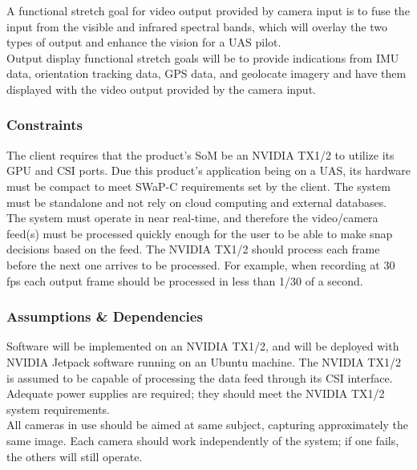 A functional stretch goal for video output provided by camera input is to fuse the 
input from the visible and infrared spectral bands, which will overlay the two types of output 
and enhance the vision for a UAS pilot. \\

Output display functional stretch goals will be to provide indications from IMU data, 
orientation tracking data, GPS data, and geolocate imagery and have them displayed 
with the video output provided by the camera input. \\

\subsubsection{Constraints}

The client requires that the product's SoM be an NVIDIA TX1/2 to utilize its GPU 
and CSI ports. Due this product's application being on a UAS, its hardware must be 
compact to meet SWaP-C requirements set by the client. The system must be standalone 
and not rely on cloud computing and external databases. \\

The system must operate in near real-time, and therefore the video/camera feed(s) must be 
processed quickly enough for the user to be able to make snap decisions based on the feed. The 
NVIDIA TX1/2 should process each frame before the next one arrives to be processed. 
For example, when recording at 30 fps each output frame should be processed in 
less than 1/30 of a second.\\

\subsubsection{Assumptions \& Dependencies}

Software will be implemented on an NVIDIA TX1/2, and will be deployed with NVIDIA 
Jetpack software running on an Ubuntu machine. The NVIDIA TX1/2 is assumed to be 
capable of processing the data feed through its CSI interface. \\

Adequate power supplies are required; they should meet the NVIDIA TX1/2 system 
requirements. \\

All cameras in use should be aimed at same subject, capturing approximately the same 
image. Each camera should work independently of the system; if one fails, the others 
will still operate.\\

